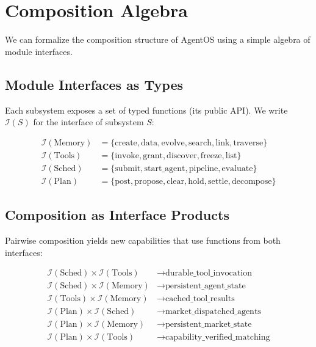 \documentclass[12pt,a4paper]{article}
\theoremstyle{definition}
\begin{document}
\section{Composition Algebra}\label{sec:algebra}

We can formalize the composition structure of AgentOS using a simple algebra
of module interfaces.

\subsection{Module Interfaces as Types}

Each subsystem exposes a set of typed functions (its public API).
We write $\mathcal{I}(S)$ for the interface of subsystem $S$:

\begin{align*}
  \mathcal{I}(\text{Memory}) &= \{\text{create}, \text{data}, \text{evolve}, \text{search}, \text{link}, \text{traverse}\} \\
  \mathcal{I}(\text{Tools})  &= \{\text{invoke}, \text{grant}, \text{discover}, \text{freeze}, \text{list}\} \\
  \mathcal{I}(\text{Sched})  &= \{\text{submit}, \text{start\_agent}, \text{pipeline}, \text{evaluate}\} \\
  \mathcal{I}(\text{Plan})   &= \{\text{post}, \text{propose}, \text{clear}, \text{hold}, \text{settle}, \text{decompose}\}
\end{align*}

\subsection{Composition as Interface Products}

Pairwise composition yields new capabilities that use functions from both interfaces:

\begin{align*}
  \mathcal{I}(\text{Sched}) \times \mathcal{I}(\text{Tools}) &\to \text{durable\_tool\_invocation} \\
  \mathcal{I}(\text{Sched}) \times \mathcal{I}(\text{Memory}) &\to \text{persistent\_agent\_state} \\
  \mathcal{I}(\text{Tools}) \times \mathcal{I}(\text{Memory}) &\to \text{cached\_tool\_results} \\
  \mathcal{I}(\text{Plan}) \times \mathcal{I}(\text{Sched}) &\to \text{market\_dispatched\_agents} \\
  \mathcal{I}(\text{Plan}) \times \mathcal{I}(\text{Memory}) &\to \text{persistent\_market\_state} \\
  \mathcal{I}(\text{Plan}) \times \mathcal{I}(\text{Tools}) &\to \text{capability\_verified\_matching}
\end{align*}
\end{document}
